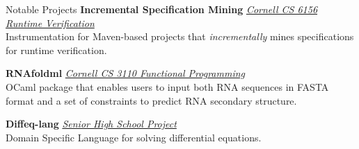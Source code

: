  
\begin{rSection}{Notable Projects}
	\textbf{Incremental Specification Mining} \href{https://github.com/cyankaet/spec-miners}{\textit{Cornell CS 6156 Runtime Verification} \ExternalLink} \\
	Instrumentation for Maven-based projects that \textit{incrementally} mines specifications for runtime verification.

	\textbf{RNAfoldml} \href{https://github.com/jpVinnie/RNAfoldml/}{\textit{Cornell CS 3110 Functional Programming} \ExternalLink} \\
	OCaml package that enables users to input both RNA sequences in FASTA format and a set of constraints to predict RNA secondary structure.

	\textbf{Diffeq-lang} \href{https://github.com/jpVinnie/diffeq-lang/}{\textit{Senior High School Project} \ExternalLink} \\
	Domain Specific Language for solving differential equations.

\end{rSection}
